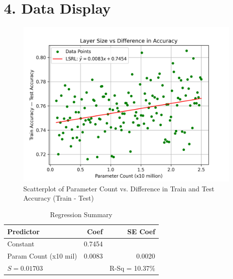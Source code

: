\documentclass[12pt]{article}
\begin{document}
    \section*{4. Data Display}
    \begin{figure}[H]
        \centering
        \includegraphics[width=1\textwidth]{Images/Scatter}
        \caption{Scatterplot of Parameter Count vs. Difference in Train and Test Accuracy (Train - Test)}
        \label{fig:scatterplot}
    \end{figure}

    \begin{table}[ht]
        \centering
        \begin{tabular}{|l|r|r|}
            \hline
            Predictor & Coef & SE Coef \\
            \hline
            Constant & 0.7454 &  \\
            Param Count (x10 mil)   & 0.0083 & 0.0020 \\
            \hline
            \multicolumn{2}{|l|}{$S = 0.01703$} & R-Sq = 10.37\% \\
            \hline
        \end{tabular}
        \caption{Regression Summary}
        \label{tab:minitab}
    \end{table}
\end{document}

